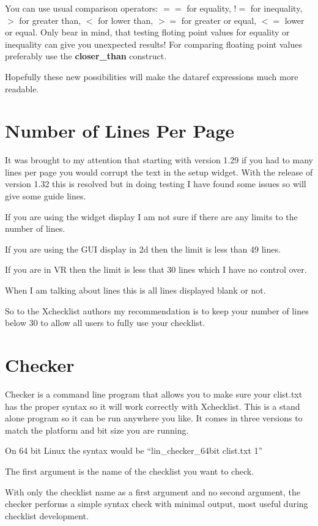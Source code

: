 \documentclass[11pt,parskip=half,a4paper]{scrartcl}
\begin{document}
You can use usual comparison operators: $==$ for equality, $!=$ for inequality, $>$ for greater than, $<$ for lower than, $>=$ for greater or equal, $<=$ lower or equal. Only bear in mind, that testing floting point values for equality or inequality can give you unexpected results! For comparing floating point values preferably use the \textbf{closer\_than} construct.

Hopefully these  new possibilities will make the dataref expressions much more readable.

\newpage
\section{Number of Lines Per Page}


It was brought to my attention that starting with version 1.29 if you had to many lines per page you would corrupt the text in the setup widget. With the release of version 1.32 this is resolved but in doing testing I have found some issues so will give some guide lines.

If you are using the widget display I am not sure if there are any limits to the number of lines.

If you are using the GUI display in 2d then the limit is less than 49 lines.

If you are in VR then the limit is less that 30 lines which I have no control over.

When I am talking about lines this is all lines displayed blank or not.

So to the Xchecklist authors my recommendation is to keep your number of lines below 30 to allow all users to fully use your checklist.

\newpage
\section{Checker}


Checker is a command line program that allows you to make sure your clist.txt has the proper syntax so it will work correctly with Xchecklist. This is a stand alone program so it can be run anywhere you like. It comes in three versions to match the platform and bit size you are running.

On 64 bit Linux the syntax would be ``lin\_checker\_64bit clist.txt 1''

The first argument is the name of the checklist you want to check.

With only the checklist name as a first argument and no second argument, the checker performs a simple syntax check with minimal output, most useful during checklist development.
\end{document}
